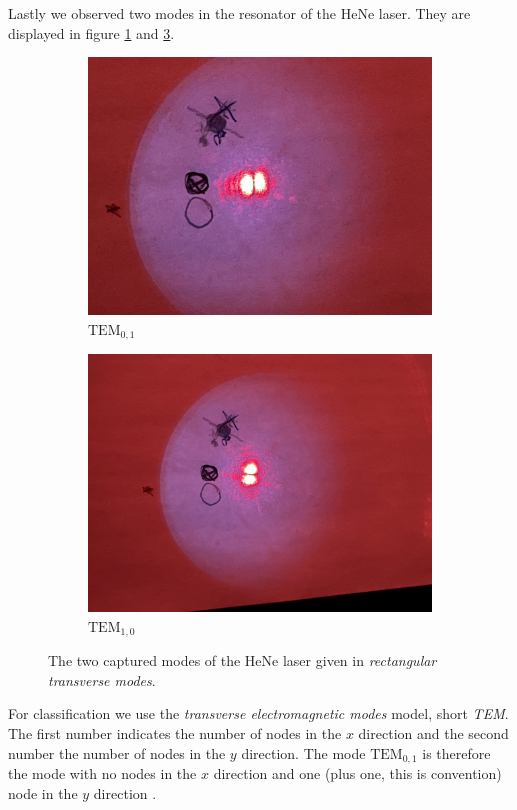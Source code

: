 \documentclass[../main.tex]{subfiles}
\begin{document}
    Lastly we observed two modes in the resonator of the HeNe laser. They are displayed in figure \ref{fig:TEM_0_1} and \ref{fig:TEM_1_0}.
    \begin{figure}[H]
        \centering
        \begin{subfigure}[b]{0.4\textwidth}
            \centering
            \includegraphics[angle=0,width=\textwidth]{Bilddateien/6/IMG_3497.jpeg}
            \caption{$\text{TEM}_{0,1}$}
            \label{fig:TEM_0_1}
        \end{subfigure}
        \begin{subfigure}[b]{0.4\textwidth}
            \centering
            \includegraphics[angle=180,width=\textwidth]{Bilddateien/6/IMG_3499.jpeg}
            \caption{$\text{TEM}_{1,0}$}
            \label{fig:TEM_1_0}
        \end{subfigure}
        \caption{The two captured modes of the HeNe laser given in \emph{rectangular transverse modes}.}
    \end{figure}
    For classification we use the \emph{transverse electromagnetic modes} model, short \emph{TEM}. The first number indicates the number of nodes in the $x$ direction and the second number the number of nodes in the $y$ direction. The mode $\text{TEM}_{0,1}$ is therefore the mode with no nodes in the $x$ direction and one (plus one, this is convention) node in the $y$ direction \cite[p. 13]{doc:NDYAGStudentManual}.
\end{document}
